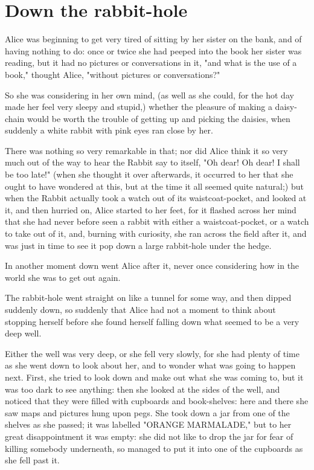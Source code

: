 \chapter*{Down the rabbit-hole}

Alice was beginning to get very tired of sitting by her sister on the bank, and of having nothing to do: once or twice she had peeped into the book her sister was reading, but it had no pictures or conversations in it, "and what is ​the use of a book," thought Alice, "without pictures or conversations?"

So she was considering in her own mind, (as well as she could, for the hot day made her feel very sleepy and stupid,) whether the pleasure of making a daisy-chain would be worth the trouble of getting up and picking the daisies, when suddenly a white rabbit with pink eyes ran close by her.

There was nothing so very remarkable in that; nor did Alice think it so very much out of the way to hear the Rabbit say to itself, "Oh dear! Oh dear! I shall be too late!" (when she thought it over afterwards, it occurred to her that she ought to have wondered at this, but at the time it all seemed quite natural;) but when the Rabbit actually took a watch out of its waistcoat-pocket, and looked at it, and then hurried on, Alice started to her feet, for it flashed across her mind that she had never before seen a rabbit with either a waistcoat-pocket, or a watch to take out of it, and, ​burning with curiosity, she ran across the field after it, and was just in time to see it pop down a large rabbit-hole under the hedge.

In another moment down went Alice after it, never once considering how in the world she was to get out again.

The rabbit-hole went straight on like a tunnel for some way, and then dipped suddenly down, so suddenly that Alice had not a moment to think about stopping herself before she found herself falling down what seemed to be a very deep well.

Either the well was very deep, or she fell very slowly, for she had plenty of time as she went down to look about her, and to wonder what was going to happen next. First, she tried to look down and make out what she was coming to, but it was too dark to see anything: then she looked at the sides of the well, and noticed that they were filled with cupboards and book-shelves: here and there she saw maps and pictures hung upon pegs. She took down ​a jar from one of the shelves as she passed; it was labelled "ORANGE MARMALADE," but to her great disappointment it was empty: she did not like to drop the jar for fear of killing somebody underneath, so managed to put it into one of the cupboards as she fell past it.

